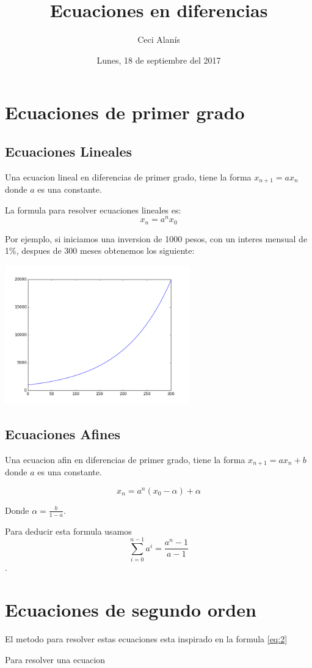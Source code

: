 \documentclass{article}
\title{Ecuaciones en diferencias}
\author{Ceci Alanís}
\date{Lunes, 18 de septiembre del 2017}
\begin{document}
\maketitle

\section{Ecuaciones de primer grado}

\subsection{Ecuaciones Lineales}

Una ecuacion lineal en diferencias de primer grado, tiene la forma $x_{n+1}=ax_n$ donde $a$ es una constante.  

La formula para resolver ecuaciones lineales es:
\begin{equation}
  \label{eq:2}
x_n=a^nx_0
\end{equation}

Por ejemplo, si iniciamos una inversion de 1000 pesos, con un interes mensual de 1\%, despues de 300 meses obtenemos los siguiente:

\begin{center}
  \includegraphics[width=8cm]{inversion.png}
\end{center}

\subsection{Ecuaciones Afines}

Una ecuacion afin en diferencias de primer grado, tiene la forma $x_{n+1}=ax_n+b $ donde $a$ es una constante.  

\begin{equation}
  \label{eq:1}
  x_n=a^n(x_0-\alpha)+ \alpha
\end{equation}

Donde $\alpha=\frac{b}{1-a}$.

Para deducir esta formula usamos $$\sum_{i=0}^{n-1}a^i= \frac{a^n-1}{a-1}$$.

\section{Ecuaciones de segundo orden}

El metodo para resolver estas ecuaciones esta inspirado en la formula \ref{eq:2}

Para resolver una ecuacion 
\end{document}
